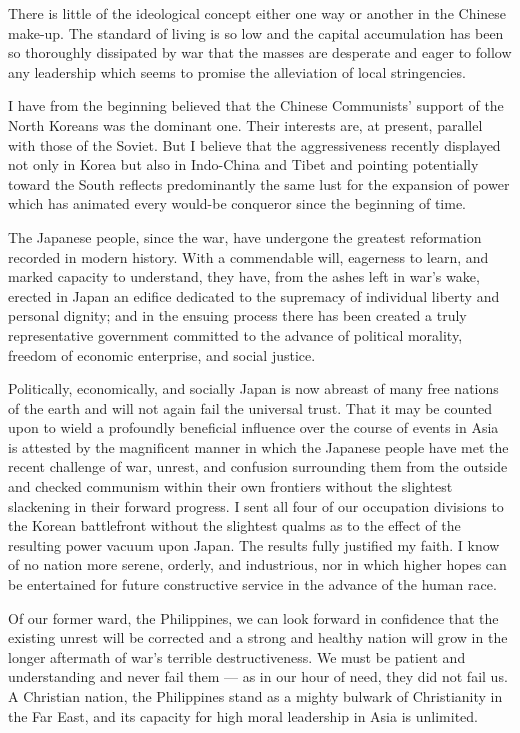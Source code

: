 \documentclass[a4paper]{amsbook}
\begin{document}
There is little of the ideological concept either one way or another in the Chinese make-up. The standard of living is so low and the capital accumulation has been so thoroughly dissipated by war that the masses are desperate and eager to follow any leadership which seems to promise the alleviation of local stringencies.

I have from the beginning believed that the Chinese Communists' support of the North Koreans was the dominant one. Their interests are, at present, parallel with those of the Soviet. But I believe that the aggressiveness recently displayed not only in Korea but also in Indo-China and Tibet and pointing potentially toward the South reflects predominantly the same lust for the expansion of power which has animated every would-be conqueror since the beginning of time.

The Japanese people, since the war, have undergone the greatest reformation recorded in modern history. With a commendable will, eagerness to learn, and marked capacity to understand, they have, from the ashes left in war's wake, erected in Japan an edifice dedicated to the supremacy of individual liberty and personal dignity; and in the ensuing process there has been created a truly representative government committed to the advance of political morality, freedom of economic enterprise, and social justice.

Politically, economically, and socially Japan is now abreast of many free nations of the earth and will not again fail the universal trust. That it may be counted upon to wield a profoundly beneficial influence over the course of events in Asia is attested by the magnificent manner in which the Japanese people have met the recent challenge of war, unrest, and confusion surrounding them from the outside and checked communism within their own frontiers without the slightest slackening in their forward progress. I sent all four of our occupation divisions to the Korean battlefront without the slightest qualms as to the effect of the resulting power vacuum upon Japan. The results fully justified my faith. I know of no nation more serene, orderly, and industrious, nor in which higher hopes can be entertained for future constructive service in the advance of the human race.

Of our former ward, the Philippines, we can look forward in confidence that the existing unrest will be corrected and a strong and healthy nation will grow in the longer aftermath of war's terrible destructiveness. We must be patient and understanding and never fail them — as in our hour of need, they did not fail us. A Christian nation, the Philippines stand as a mighty bulwark of Christianity in the Far East, and its capacity for high moral leadership in Asia is unlimited.
\end{document}
